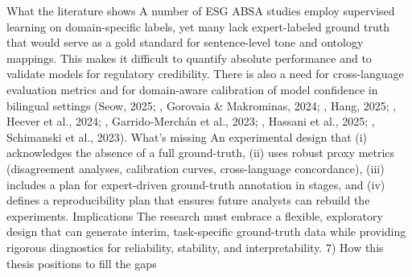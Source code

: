 What the literature shows
A number of ESG ABSA studies employ supervised learning on domain-specific labels, yet many lack expert-labeled ground truth that would serve as a gold standard for sentence-level tone and ontology mappings. This makes it difficult to quantify absolute performance and to validate models for regulatory credibility. There is also a need for cross-language evaluation metrics and for domain-aware calibration of model confidence in bilingual settings (Seow, 2025; , Gorovaia & Makrominas, 2024; , Hang, 2025; , Heever et al., 2024; , Garrido-Merchán et al., 2023; , Hassani et al., 2025; , Schimanski et al., 2023).
What’s missing
An experimental design that (i) acknowledges the absence of a full ground-truth, (ii) uses robust proxy metrics (disagreement analyses, calibration curves, cross-language concordance), (iii) includes a plan for expert-driven ground-truth annotation in stages, and (iv) defines a reproducibility plan that ensures future analysts can rebuild the experiments.
Implications
The research must embrace a flexible, exploratory design that can generate interim, task-specific ground-truth data while providing rigorous diagnostics for reliability, stability, and interpretability.
7) How this thesis positions to fill the gaps

